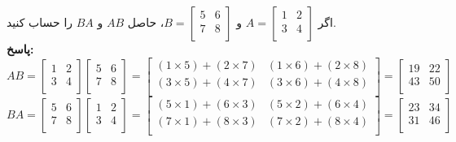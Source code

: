 \begin{example}
	اگر
	$A=
	\begin{bmatrix}
		1 & 2 \\
		3 & 4 \\	
	\end{bmatrix}
	$
	و
	$B=
	\begin{bmatrix}
		5 & 6 \\
		7 & 8 \\	
	\end{bmatrix}
	$،
	حاصل $AB$ و $BA$ را حساب کنید. \\
	\textbf{پاسخ:}
	\[
	AB=
	\begin{bmatrix}
		1 & 2 \\
		3 & 4 \\	
	\end{bmatrix}
	\begin{bmatrix}
		5 & 6 \\
		7 & 8 \\	
	\end{bmatrix}
	=
	\begin{bmatrix}
		(1 \times 5)+(2 \times 7) & (1 \times 6)+(2 \times 8) \\
		(3 \times 5)+(4 \times 7) & (3 \times 6)+(4 \times 8) \\	
	\end{bmatrix}
	=
	\begin{bmatrix}
		19 & 22 \\
		43 & 50 \\	
	\end{bmatrix}
	\]
	\[
	BA=
	\begin{bmatrix}
		5 & 6 \\
		7 & 8 \\	
	\end{bmatrix}
	\begin{bmatrix}
		1 & 2 \\
		3 & 4 \\	
	\end{bmatrix}
	=
	\begin{bmatrix}
		(5 \times 1)+(6 \times 3) & (5 \times 2)+(6 \times 4) \\
		(7 \times 1)+(8 \times 3) & (7 \times 2)+(8 \times 4) \\	
	\end{bmatrix}
	=
	\begin{bmatrix}
		23 & 34 \\
		31 & 46 \\	
	\end{bmatrix}
	\]
\end{example}

